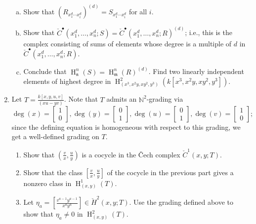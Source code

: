\documentclass[11pt]{book}
\numberwithin{equation}{section}
\numberwithin{theorem}{chapter}
\theoremstyle{definition}
\newtheorem*{basic properties}{Basic Properties}
\newtheorem*{Important Remark}{Important Remark}
\theoremstyle{remark}
\newcommand{\NN}{\mathbb{N}}
\newcommand{\m}{\mathfrak{m}}
\newcommand{\n}{\mathfrak{n}}
\renewcommand{\H}{\operatorname{H}}
\begin{document}
\begin{enumerate}[1)]
\begin{enumerate}[a)]
		
		\item Show that $(R_{x_1^d\cdots x_i^d})^{(d)}=S_{x_1^d\cdots x_i^d}$ for all $i$.
		

		\item Show that $\check{C}^{\bullet}(x_1^d,\dots,x_n^d;S)=\check{C}^{\bullet}(x_1^d,\dots,x_n^d;R)^{(d)}$; i.e., this is the complex consisting of sums of elements whose degree is a multiple of $d$ in $\check{C}^{\bullet}(x_1^d,\dots,x_n^d;R)$.
		

		
		\item Conclude that $\H^n_\n(S)=\H^n_\m(R)^{(d)}$. Find two linearly independent elements of highest degree in $\H^2_{(x^3,x^2y,xy^2,y^3)}(k[x^3,x^2y,xy^2,y^3])$.
	\end{enumerate}
	

	
	\item Let $T =\displaystyle \frac{k[x,y,u,v]}{(xu-yv)}$. Note that $T$ admits an $\NN^2$-grading via 
	\[ \deg(x)=\begin{bmatrix} 1 \\ 0 \end{bmatrix} ,\deg(y)= \begin{bmatrix} 0 \\ 1 \end{bmatrix}, \deg(u)= \begin{bmatrix} 0 \\ 1  \end{bmatrix}, \deg(v)= \begin{bmatrix} 1 \\ 0 \end{bmatrix}; \]
	since the defining equation is homogeneous with respect to this grading, we get a well-defined grading on $T$.
	

	
	
	
	\begin{enumerate}
		\item Show that $\displaystyle \left( \frac{v}{x}, \frac{u}{y} \right)$ is a cocycle in the \v{C}ech complex $\check{C}^1(x,y;T)$.
		

		\item Show that the class $\displaystyle \left[ \frac{v}{x}, \frac{u}{y} \right]$ of the cocycle in the previous part gives a nonzero class in $\H^1_{(x,y)}(T)$.
		

		
		\item Let $\displaystyle \eta_a=\left[\frac{v^{a-1} y^{a-1}}{x^a y^a}\right]\in \check{H}^2(x,y;T)$.
		Use the grading defined above to show that $\eta_a\neq 0$ in $\H^2_{(x,y)}(T)$.
		


\end{enumerate}
\end{enumerate}
\end{document}
